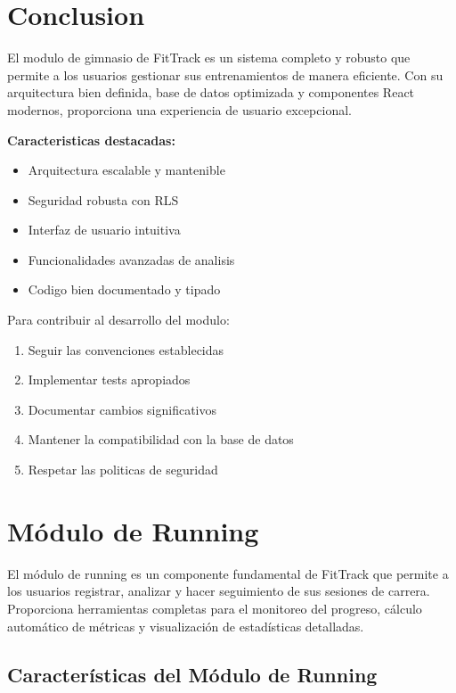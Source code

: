 \documentclass[12pt,a4paper]{article}
\begin{document}
\section{Conclusion}

El modulo de gimnasio de FitTrack es un sistema completo y robusto que permite a los usuarios gestionar sus entrenamientos de manera eficiente. Con su arquitectura bien definida, base de datos optimizada y componentes React modernos, proporciona una experiencia de usuario excepcional.

\textbf{Caracteristicas destacadas:}
\begin{itemize}
    \item Arquitectura escalable y mantenible
    \item Seguridad robusta con RLS
    \item Interfaz de usuario intuitiva
    \item Funcionalidades avanzadas de analisis
    \item Codigo bien documentado y tipado
\end{itemize}

Para contribuir al desarrollo del modulo:
\begin{enumerate}
    \item Seguir las convenciones establecidas
    \item Implementar tests apropiados
    \item Documentar cambios significativos
    \item Mantener la compatibilidad con la base de datos
    \item Respetar las politicas de seguridad
\end{enumerate}

\section{Módulo de Running}

El módulo de running es un componente fundamental de FitTrack que permite a los usuarios registrar, analizar y hacer seguimiento de sus sesiones de carrera. Proporciona herramientas completas para el monitoreo del progreso, cálculo automático de métricas y visualización de estadísticas detalladas.

\subsection{Características del Módulo de Running}
\end{document}
